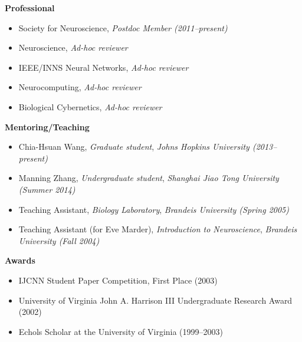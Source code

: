 \documentclass[10pt]{article}
\begin{document}
\pagebreak
{\large \textbf{Professional}}
\begin{itemize}
    \item Society for Neuroscience, \emph{Postdoc Member (2011--present)}
    \item Neuroscience, \emph{Ad-hoc reviewer}
    \item IEEE/INNS Neural Networks, \emph{Ad-hoc reviewer}
    \item Neurocomputing, \emph{Ad-hoc reviewer}
    \item Biological Cybernetics, \emph{Ad-hoc reviewer}
\end{itemize}
    
{\large \textbf{Mentoring/Teaching}}
\begin{itemize}
    \item Chia-Hsuan Wang, \emph{Graduate student}, \emph{Johns Hopkins University (2013--present)}
    \item Manning Zhang, \emph{Undergraduate student}, \emph{Shanghai Jiao Tong University (Summer 2014)}
    \item Teaching Assistant, \emph{Biology Laboratory}, \emph{Brandeis University (Spring 2005)}
    \item Teaching Assistant (for Eve Marder), \emph{Introduction to Neuroscience}, \emph{Brandeis University (Fall 2004)}
\end{itemize}


{\large \textbf{Awards}}
\begin{itemize}
    \item IJCNN Student Paper Competition, First Place (2003)
    \item University of Virginia John A. Harrison III Undergraduate Research Award (2002)
    \item Echols Scholar at the University of Virginia (1999--2003) 
\end{itemize}

\end{document}
